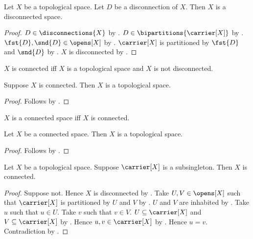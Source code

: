 \begin{proposition}\label{disconnected_from_disconnection}
    Let $X$ be a topological space.
    Let $D$ be a disconnection of $X$.
    Then $X$ is a disconnected space.
\end{proposition}
\begin{proof}
    $D\in\disconnections{X}$ by .
    $D\in\bipartitions{\carrier[X]}$ by .
    $\fst{D},\snd{D}\in\opens[X]$ by .
    $\carrier[X]$ is partitioned by $\fst{D}$ and $\snd{D}$
        by .
    $X$ is disconnected by .
\end{proof}

\begin{definition}\label{connected}
    $X$ is connected iff $X$ is a topological space and
        $X$ is not disconnected.
\end{definition}

\begin{classification}\label{connected_is_topological}
    Suppose $X$ is connected.
    Then $X$ is a topological space.
\end{classification}
\begin{proof}
    Follows by .
\end{proof}

\begin{abbreviation}\label{connected_space}
    $X$ is a connected space iff $X$ is connected.
\end{abbreviation}

\begin{classification}\label{connected_space_is_topological}
    Let $X$ be a connected space.
    Then $X$ is a topological space.
\end{classification}
\begin{proof}
    Follows by .
\end{proof}

\begin{theorem}\label{subsingleton_topological_space_is_connected}
    Let $X$ be a topological space.
    Suppose $\carrier[X]$ is a subsingleton.
    Then $X$ is connected.
\end{theorem}
\begin{proof}
    Suppose not.
    Hence $X$ is disconnected by .
    Take $U,V\in\opens[X]$ such that $\carrier[X]$ is partitioned by $U$ and $V$ by
        .
    $U$ and $V$ are inhabited by .
    Take $u$ such that $u\in U$.
    Take $v$ such that $v\in V$.
    $U\subseteq\carrier[X]$ and $V\subseteq\carrier[X]$ by .
    Hence $u,v\in\carrier[X]$ by .
    Hence $u=v$.
    Contradiction by .
\end{proof}
